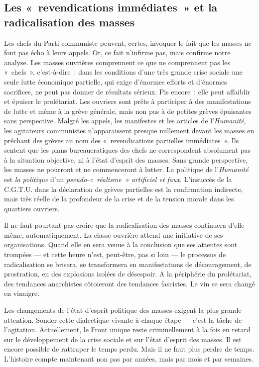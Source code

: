 \documentclass[french,twoside]{book} %
\begin{document}
 \subsection[{Les « revendications immédiates » et la radicalisation des masses}]{Les « revendications immédiates » et la radicalisation des masses}
\noindent Les chefs du Parti communiste peuvent, certes, invoquer le fait que les masses ne font pas écho à leurs appels. Or, ce fait n’infirme pas, mais confirme notre analyse. Les masses ouvrières comprennent ce que ne comprennent pas les « chefs », c’est-à-dire : dans les conditions d’une très grande crise sociale une seule lutte économique partielle, qui exige d’énormes efforts et d’énormes sacrifices, ne peut pas donner de résultats sérieux. Pis encore : elle peut affaiblir et épuiser le prolétariat. Les ouvriers sont prêts à participer à des manifestations de lutte et même à la grève générale, mais non pas à de petites grèves épuisantes sans perspective. Malgré les appels, les manifestes et les articles de l’\emph{Humanité}, les agitateurs communistes n’apparaissent presque nullement devant les masses en prêchant des grèves au nom des « revendications partielles immédiates ». Ils sentent que les plans bureaucratiques des chefs ne correspondent absolument pas à la situation objective, ni à l’état d’esprit des masses. Sans grande perspective, les masses ne pourront et ne commenceront à lutter. La politique de l’\emph{Humanité} est \emph{la politique} d’un \emph{pseudo-« réalisme » artificiel et faux}. L’insuccès de la C.G.T.U. dans la déclaration de grèves partielles est la confirmation indirecte, mais très réelle de la profondeur de la crise et de la tension morale dans les quartiers ouvriers.\par
Il ne faut pourtant pas croire que la radicalisation des masses continuera d’elle-même, automatiquement. La classe ouvrière attend une initiative de ses organisations. Quand elle en sera venue à la conclusion que ses attentes sont trompées — et cette heure n’est, peut-être, pas si loin — le processus de radicalisation se brisera, se transformera en manifestations de découragement, de prostration,  en des explosions isolées de désespoir. A la périphérie du prolétariat, des tendances anarchistes côtoieront des tendances fascistes. Le vin se sera changé en vinaigre.\par
Les changements de l’état d’esprit politique des masses exigent la plus grande attention. Sonder cette dialectique vivante à chaque étape — c’est la tâche de l’agitation. Actuellement, le Front unique reste criminellement à la fois en retard sur le développement de la crise sociale et sur l’état d’esprit des masses. Il est encore possible de rattraper le temps perdu. Mais il ne faut plus perdre de temps. L’histoire compte maintenant non pas par années, mais par mois et par semaines.
\end{document}
